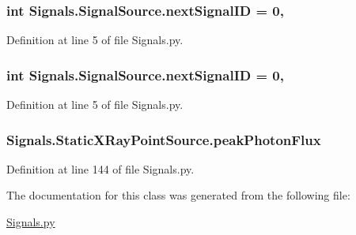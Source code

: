 \subsubsection[{\texorpdfstring{next\+Signal\+ID}{nextSignalID}}]{\setlength{\rightskip}{0pt plus 5cm}int Signals.\+Signal\+Source.\+next\+Signal\+ID = 0\hspace{0.3cm}{\ttfamily [static]}, {\ttfamily [inherited]}}\hypertarget{classSignals_1_1SignalSource_abcff0d069f17cb5ebe3eff15b6283a64}{}\label{classSignals_1_1SignalSource_abcff0d069f17cb5ebe3eff15b6283a64}


Definition at line 5 of file Signals.\+py.

\subsubsection[{\texorpdfstring{next\+Signal\+ID}{nextSignalID}}]{\setlength{\rightskip}{0pt plus 5cm}int Signals.\+Signal\+Source.\+next\+Signal\+ID = 0\hspace{0.3cm}{\ttfamily [static]}, {\ttfamily [inherited]}}\hypertarget{classSignals_1_1SignalSource_abcff0d069f17cb5ebe3eff15b6283a64}{}\label{classSignals_1_1SignalSource_abcff0d069f17cb5ebe3eff15b6283a64}


Definition at line 5 of file Signals.\+py.

\subsubsection[{\texorpdfstring{peak\+Photon\+Flux}{peakPhotonFlux}}]{\setlength{\rightskip}{0pt plus 5cm}Signals.\+Static\+X\+Ray\+Point\+Source.\+peak\+Photon\+Flux}\hypertarget{classSignals_1_1StaticXRayPointSource_a7e16da6506ee1b83c9858dce9c7856ea}{}\label{classSignals_1_1StaticXRayPointSource_a7e16da6506ee1b83c9858dce9c7856ea}


Definition at line 144 of file Signals.\+py.



The documentation for this class was generated from the following file\+:\begin{DoxyCompactItemize}
\item 
\hyperlink{Signals_8py}{Signals.\+py}\end{DoxyCompactItemize}
